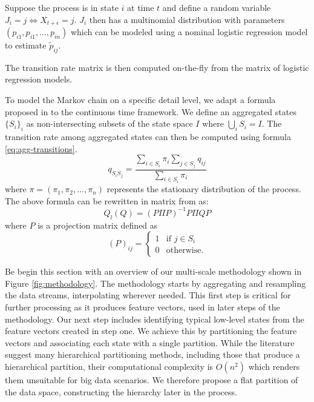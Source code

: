 \begin{itemize}
	Suppose the process is in state $i$ at time $t$ and define a random variable 
	$J_i = j \Leftrightarrow X_{t + \epsilon} = j$. $J_i$ then has a multinomial distribution
	with parameters $(p_{i1}, p_{i1}, ..., p_{in})$ which can be modeled using a nominal
	logistic regression model \cite{glm-introduction} to estimate $\tilde{p}_{ij}$.
	
	The transition rate matrix is then computed on-the-fly from the matrix of logistic regression models.
	
	To model the Markov chain on a specific detail level, we adapt a formula proposed in \cite{5746509}
	to the continuous time framework. We define an aggregated states $\{S_i\}_i$ as non-intersecting
	subsets of the state space $I$ where $\bigcup_i S_i = I$. The transition rate among aggregated
	states can then be computed using formula \ref{eq:agg-transitions}.
	\begin{equation}
		\label{eq:agg-transitions}
		q_{S_i S_j} = \frac{\sum\limits_{i \in S_i}\pi_i \sum\limits_{j \in S_j} q_{ij}}{\sum\limits_{i \in S_i}\pi_i}
	\end{equation}
	where $\pi = (\pi_1, \pi_2, ..., \pi_n)$ represents the stationary distribution of the process. The
	above formula can be rewritten in matrix from as:
	\begin{equation}
		Q_l(Q) = \left(P\Pi P\right)^{-1}P\Pi Q P
	\end{equation}
	where $P$ is a projection matrix defined as
	\begin{equation}
		\left(P\right)_{ij} = 
			\left\{
				\begin{array}{ll}
					1 & \mbox{if } j \in S_i \\
					0 & \mbox{otherwise}.
				\end{array}
			\right.
	\end{equation}

	
\end{itemize}

Be begin this section with an overview of our multi-scale methodology shown in Figure \ref{fig:methodology}.
The methodology starts by aggregating and resampling the data streams, interpolating wherever needed. This
first step is critical for further processing as it produces feature vectors, used in later steps of the
methodology. Our next step includes identifying typical low-level states from the feature vectors
created in step one. We achieve this by partitioning the feature vectors and associating each state
with a single partition. While the literature suggest many hierarchical partitioning methods, including
those that produce a hierarchical partition, their computational complexity is $O(n^2)$ which
renders them unsuitable for big data scenarios. We therefore propose a flat partition of the data space,
constructing the hierarchy later in the process.


